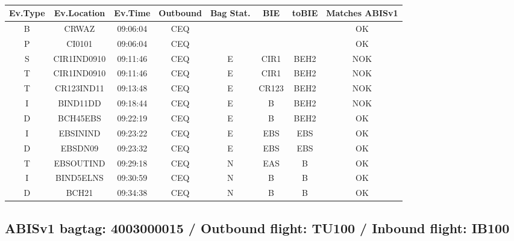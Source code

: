 \documentclass{report}
\begin{document}
\paragraph{}
\begin{longtable}{cccccccc}    \toprule
\rowcolor{white!50}
\textbf{Ev.Type} & \textbf{Ev.Location} & \textbf{Ev.Time} & \textbf{Outbound} & \textbf{Bag Stat.} & \textbf{BIE} & \textbf{toBIE} & \textbf{Matches ABISv1} \\\midrule
B & CRWAZ & 09:06:04  & CEQ &  &  &  & OK\\
P & CI0101 & 09:06:04  & CEQ &  &  &  & OK\\
S & CIR1IND0910 & 09:11:46  & CEQ & E & CIR1 & BEH2 & NOK\\
T & CIR1IND0910 & 09:11:46  & CEQ & E & CIR1 & BEH2 & NOK\\
T & CR123IND11 & 09:13:48  & CEQ & E & CR123 & BEH2 & NOK\\
I & BIND11DD & 09:18:44  & CEQ & E & B & BEH2 & NOK\\
D & BCH45EBS & 09:22:19  & CEQ & E & B & BEH2 & OK\\
I & EBSININD & 09:23:22  & CEQ & E & EBS & EBS & OK\\
D & EBSDN09 & 09:23:32  & CEQ & E & EBS & EBS & OK\\
T & EBSOUTIND & 09:29:18  & CEQ & N & EAS & B & OK\\
I & BIND5ELNS & 09:30:59  & CEQ & N & B & B & OK\\
D & BCH21 & 09:34:38  & CEQ & N & B & B & OK\\
\bottomrule
\end{longtable}
\subsection*{ABISv1 bagtag: 4003000015 / Outbound flight: TU100 / Inbound flight: IB100}
\end{document}

